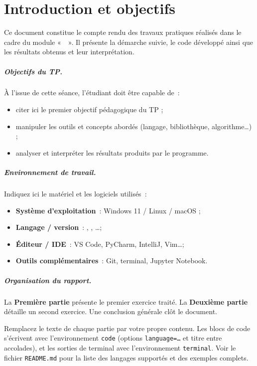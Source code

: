 \chapter*{Introduction et objectifs}

Ce document constitue le compte rendu des travaux pratiques réalisés dans le
cadre du module «~\moduleNom~». Il présente la démarche suivie, le code
développé ainsi que les résultats obtenus et leur interprétation.

\paragraph{Objectifs du TP.}
À l'issue de cette séance, l'étudiant doit être capable de~:
\begin{itemize}[leftmargin=1.2em,itemsep=1pt]
  \item citer ici le premier objectif pédagogique du TP ;
  \item manipuler les outils et concepts abordés (langage, bibliothèque,
    algorithme\ldots) ;
  \item analyser et interpréter les résultats produits par le programme.
\end{itemize}

\paragraph{Environnement de travail.}
Indiquez ici le matériel et les logiciels utilisés~:
\begin{itemize}[leftmargin=1.2em,itemsep=1pt]
  \item \textbf{Système d'exploitation}~: Windows 11 / Linux / macOS ;
  \item \textbf{Langage / version}~: , ,
    \ldots;
  \item \textbf{Éditeur / IDE}~: VS Code, PyCharm, IntelliJ, Vim\ldots;
  \item \textbf{Outils complémentaires}~: Git, terminal, Jupyter Notebook.
\end{itemize}

\paragraph{Organisation du rapport.}
La \textbf{Première partie} présente le premier exercice traité. La
\textbf{Deuxième partie} détaille un second exercice. Une conclusion générale
clôt le document.

\begin{remarque}
Remplacez le texte de chaque partie par votre propre contenu. Les blocs de
code s'écrivent avec l'environnement \texttt{code} (options
\texttt{language=\ldots} et titre entre accolades), et les sorties de terminal
avec l'environnement \texttt{terminal}. Voir le fichier \texttt{README.md}
pour la liste des langages supportés et des exemples complets.
\end{remarque}
